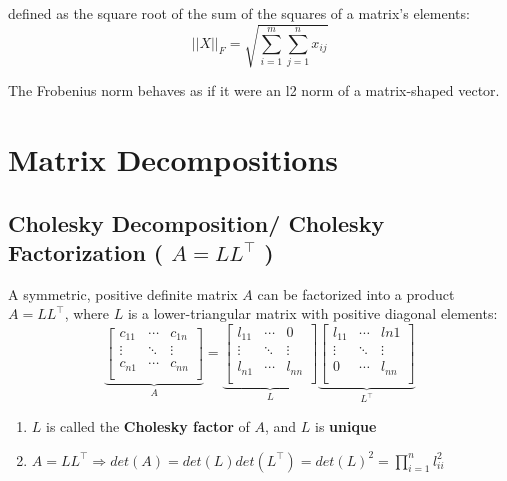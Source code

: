 defined as the square root of the sum of the squares of a matrix’s elements:
\[
    \displaystyle
    ||X||_F = \sqrt{
        \sum_{i=1}^{m} \sum_{j=1}^{n} x_{ij}
    }
\]

The Frobenius norm behaves as if it were an l2 norm of a matrix-shaped vector.


\section{Matrix Decompositions}

\subsection{Cholesky Decomposition/ Cholesky Factorization ( $A = LL^\top$ ) \cite{mfml-1}}\label{Cholesky Decomposition/ Cholesky Factorization}

A symmetric, positive definite matrix $A$ can be factorized into a product $A = LL^\top$, where $L$ is a lower-triangular matrix with positive diagonal elements:
\[
    \displaystyle
    \underset{\displaystyle A}{
      \underbrace{
        \begin{bmatrix}
              c_{11} & \cdots & c_{1n} \\
              \vdots & \ddots & \vdots \\
              c_{n1} & \cdots & c_{nn}\\
          \end{bmatrix}
      }
   }
   =
   \underset{\displaystyle L}{
      \underbrace{
          \begin{bmatrix}
              l_{11} & \cdots & 0 \\
              \vdots & \ddots & \vdots \\
              l_{n1} & \cdots & l_{nn}\\
          \end{bmatrix}
      }
   }
   \underset{\displaystyle L^\top}{
        \underbrace{
              \begin{bmatrix}
                  l_{11} & \cdots & l{n1} \\
                  \vdots & \ddots & \vdots \\
                  0 & \cdots & l_{nn}\\
              \end{bmatrix}
        }
    }
\]

\begin{enumerate}
    \item $L$ is called the \textbf{Cholesky factor} of $A$, and $L$ is \textbf{unique}

    \item $\displaystyle A = LL^\top \Rightarrow det(A) = det(L)det(L^\top) = det(L)^2 = \prod_{i=1}^{n} l_{ii}^2$
\end{enumerate}

